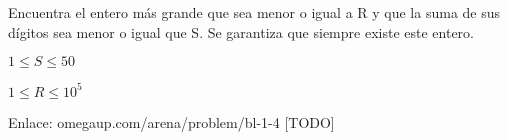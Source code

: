 Encuentra el entero más grande que sea menor o igual a R y que la suma de sus dígitos sea menor o igual que S. Se garantiza que siempre existe este entero.
\begin{plimits}
	\item \(1\leq S\leq 50\)
	\item \(1\leq R\leq10^5\)
\end{plimits}

Enlace: omegaup.com/arena/problem/bl-1-4 [TODO]